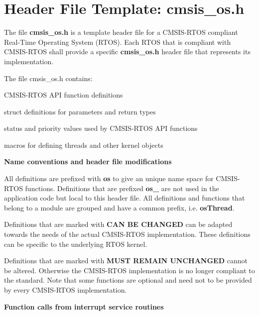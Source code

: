 \chapter{Header File Template\+: cmsis\+\_\+os.\+h }
\hypertarget{cmsis_os_h}{}\label{cmsis_os_h}
The file {\bfseries{cmsis\+\_\+os.\+h}} is a template header file for a CMSIS-\/\+RTOS compliant Real-\/\+Time Operating System (RTOS). Each RTOS that is compliant with CMSIS-\/\+RTOS shall provide a specific {\bfseries{cmsis\+\_\+os.\+h}} header file that represents its implementation.

The file cmsis\+\_\+os.\+h contains\+:
\begin{DoxyItemize}
\item CMSIS-\/\+RTOS API function definitions
\item struct definitions for parameters and return types
\item status and priority values used by CMSIS-\/\+RTOS API functions
\item macros for defining threads and other kernel objects
\end{DoxyItemize}

{\bfseries{Name conventions and header file modifications}}

All definitions are prefixed with {\bfseries{os}} to give an unique name space for CMSIS-\/\+RTOS functions. Definitions that are prefixed {\bfseries{os\+\_\+}} are not used in the application code but local to this header file. All definitions and functions that belong to a module are grouped and have a common prefix, i.\+e. {\bfseries{os\+Thread}}.

Definitions that are marked with {\bfseries{CAN BE CHANGED}} can be adapted towards the needs of the actual CMSIS-\/\+RTOS implementation. These definitions can be specific to the underlying RTOS kernel.

Definitions that are marked with {\bfseries{MUST REMAIN UNCHANGED}} cannot be altered. Otherwise the CMSIS-\/\+RTOS implementation is no longer compliant to the standard. Note that some functions are optional and need not to be provided by every CMSIS-\/\+RTOS implementation.

{\bfseries{Function calls from interrupt service routines}}

